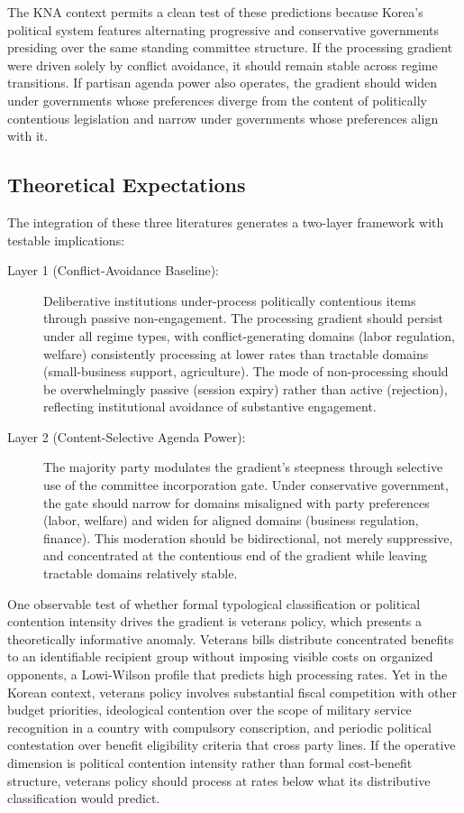 \documentclass[11pt]{article}
\begin{document}
The KNA context permits a clean test of these predictions because Korea's political system features alternating progressive and conservative governments presiding over the same standing committee structure. If the processing gradient were driven solely by conflict avoidance, it should remain stable across regime transitions. If partisan agenda power also operates, the gradient should widen under governments whose preferences diverge from the content of politically contentious legislation and narrow under governments whose preferences align with it.

\subsection{Theoretical Expectations}

The integration of these three literatures generates a two-layer framework with testable implications:

\begin{description}
\item[Layer 1 (Conflict-Avoidance Baseline):] Deliberative institutions under-process politically contentious items through passive non-engagement. The processing gradient should persist under all regime types, with conflict-generating domains (labor regulation, welfare) consistently processing at lower rates than tractable domains (small-business support, agriculture). The mode of non-processing should be overwhelmingly passive (session expiry) rather than active (rejection), reflecting institutional avoidance of substantive engagement.

\item[Layer 2 (Content-Selective Agenda Power):] The majority party modulates the gradient's steepness through selective use of the committee incorporation gate. Under conservative government, the gate should narrow for domains misaligned with party preferences (labor, welfare) and widen for aligned domains (business regulation, finance). This moderation should be bidirectional, not merely suppressive, and concentrated at the contentious end of the gradient while leaving tractable domains relatively stable.
\end{description}

One observable test of whether formal typological classification or political contention intensity drives the gradient is veterans policy, which presents a theoretically informative anomaly. Veterans bills distribute concentrated benefits to an identifiable recipient group without imposing visible costs on organized opponents, a Lowi-Wilson profile that predicts high processing rates. Yet in the Korean context, veterans policy involves substantial fiscal competition with other budget priorities, ideological contention over the scope of military service recognition in a country with compulsory conscription, and periodic political contestation over benefit eligibility criteria that cross party lines. If the operative dimension is political contention intensity rather than formal cost-benefit structure, veterans policy should process at rates below what its distributive classification would predict.
\end{document}
